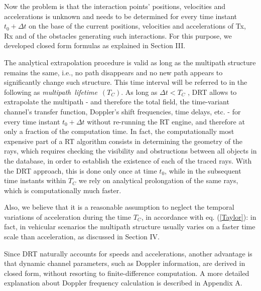 Now the problem is that the interaction points' positions, velocities and accelerations is unknown and needs to be determined for every time instant $t_{0}+\Delta t$ on the base of the current positions, velocities and accelerations of Tx, Rx and of the obstacles generating such interactions. For this purpose, we developed closed form formulas as explained in Section III.

The analytical extrapolation procedure is valid as long as the multipath structure remains the same, i.e., no path disappears and no new path appears to significantly change such structure. This time interval will be referred to in the following as \textit{multipath~lifetime}~$(T_C)$. As long as $\Delta t < T_C$ , DRT allows to extrapolate the multipath - and therefore the total field, the time-variant channel's transfer function, Doppler's shift frequencies, time delays, etc. - for every time instant $t_{0}+\Delta t$ without re-running the RT engine, and therefore at only a fraction of the computation time. In fact, the computationally most expensive part of a RT algorithm consists in determining the geometry of the rays, which requires checking the visibility and obstructions between all objects in the database, in order to establish the existence of each of the traced rays. With the DRT approach, this is done only once at time $t_0$, while in the subsequent time instants within $T_C$ we rely on analytical prolongation of the same rays, which is computationally much faster.

Also, we believe that it is a reasonable assumption to neglect the temporal variations of acceleration during the time $T_C$, in accordance with eq. (\ref{Taylor}): in fact, in vehicular scenarios the multipath structure usually varies on a faster time scale than acceleration, as discussed in Section IV.

Since DRT naturally accounts for speeds and accelerations, another advantage is that dynamic channel parameters, such as Doppler information, are derived in closed form, without resorting to finite-difference computation. A more detailed explanation about Doppler frequency calculation is described in Appendix A.